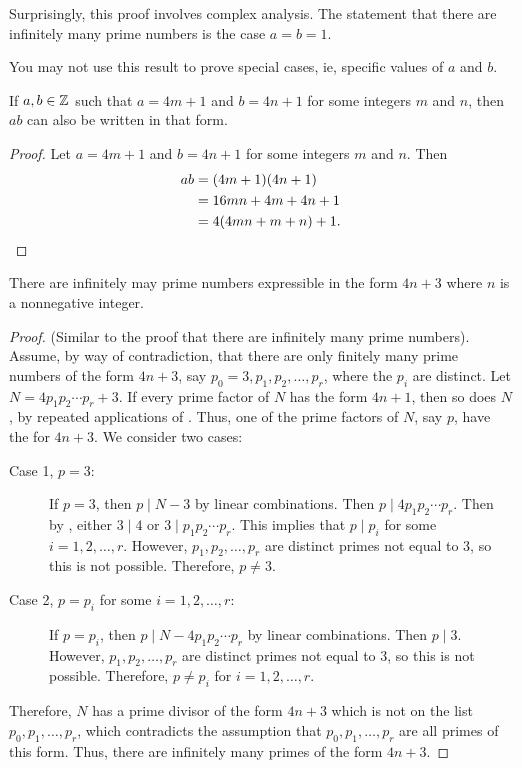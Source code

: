 \documentclass{ximera}
\begin{document}
\begin{remark}
    Surprisingly, this proof involves complex analysis. The statement that there are infinitely many prime numbers is the case $a=b=1$.
\end{remark}

\begin{warning}
    You may not use this result to prove special cases, ie, specific values of $a$ and $b$.
\end{warning}


\begin{lemma}\label{lem:prod-goodprimes}
 If $a,b\in\mathbb Z$ such that $a=4m+1$ and $b=4n+1$ for some integers $m$ and $n$, then $ab$ can also be written in that form.
\begin{proof}
 Let $a=4m+1$ and $b=4n+1$ for some integers $m$ and $n$. Then 
\begin{align*}
ab&=(4m+1)(4n+1)\\
&=16mn+4m+4n+1\\
&=4(4mn+m+n)+1.\qedhere
\end{align*}
\end{proof}
\end{lemma}

\begin{prop*}[Proposition 1.22]\label{prop:inf-badprimes}
 There are infinitely may prime numbers expressible in the form $4n+3$ where $n$ is a nonnegative integer.
\end{prop*}
\begin{proof}
 (Similar to the proof that there are infinitely many prime numbers). Assume, by way of contradiction, that there are only finitely many prime numbers of the form $4n+3$, say $p_0=3, p_1,p_2,\dots, p_r$, where the $p_i$ are distinct. Let $N=4p_1 p_2 \cdots p_r+3$. If every prime factor of $N$ has the form $4n+1$, then so does $N$, by repeated applications of . Thus, one of the prime factors of $N$, say $p$, have the for $4n+3$. We consider two cases:
 
\begin{description}
 \item[Case 1, $p=3$:] If $p=3$, then $p\mid N-3$ by linear combinations. Then $p\mid 4 p_1p_2\cdots p_r$. Then by , either $3\mid 4$ or $3\mid p_1p_2\cdots p_r$. This implies that $p\mid p_i$ for some $i=1,2,\dots,r$. However, $p_1,p_2,\dots,p_r$ are distinct primes not equal to $3$, so this is not possible. Therefore, $p\neq 3$.
 
 \item[Case 2, $p=p_i$ for some $i=1,2,\dots, r$:] If $p=p_i$, then $p\mid N-4p_1p_2\cdots p_r$ by linear combinations. Then $p\mid 3$. However, $p_1,p_2,\dots,p_r$ are distinct primes not equal to $3$, so this is not possible. Therefore, $p\neq p_i$ for $i=1,2,\dots,r$.
\end{description}
Therefore, $N$ has a prime divisor of the form $4n+3$ which is not on the list $p_0,p_1,\dots,p_r$, which contradicts the assumption that $p_0,p_1,\dots,p_r$ are all primes of this form. Thus, there are infinitely many primes of the form $4n+3$.
\end{proof}

\end{document}

